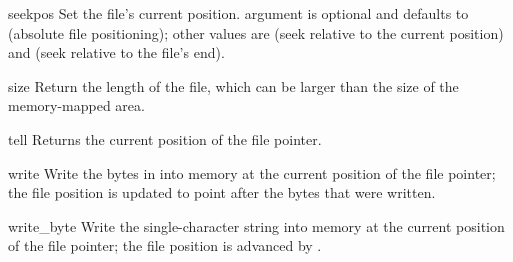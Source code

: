 \begin{methoddesc}{seek}{pos}
Set the file's current position.
 argument is optional and defaults to  (absolute
file positioning); other values are  (seek relative to the
current position) and  (seek relative to the file's end).
\end{methoddesc}

\begin{methoddesc}{size}{}
Return the length of the file, which can be larger than the size
of the memory-mapped area. 
\end{methoddesc}

\begin{methoddesc}{tell}{}
Returns the current position of the file pointer.
\end{methoddesc}

\begin{methoddesc}{write}{}
Write the bytes in  into memory at the current position of
the file pointer; the file position is updated to point after the
bytes that were written. 
\end{methoddesc}

\begin{methoddesc}{write_byte}{}
Write the single-character string  into memory at the
current position of the file pointer; the file position is advanced by
.
\end{methoddesc}
